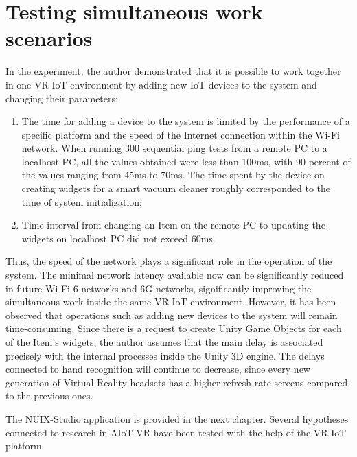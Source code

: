\section{Testing simultaneous work scenarios}

In the experiment, the author demonstrated that it is possible to work together in one VR-IoT environment by adding new IoT devices to the system and changing their parameters:
\begin{enumerate}
    \item The time for adding a device to the system is limited by the performance of a specific platform and the speed of the Internet connection within the Wi-Fi network. When running 300 sequential ping tests from a remote PC to a localhost PC, all the values ​​obtained were less than 100ms, with 90 percent of the values ranging from 45ms to 70ms. The time spent by the device on creating widgets for a smart vacuum cleaner roughly corresponded to the time of system initialization;
    \item Time interval from changing an Item on the remote PC to updating the widgets on localhost PC did not exceed 60ms.
\end{enumerate}

Thus, the speed of the network plays a significant role in the operation of the system. The minimal network latency available now can be significantly reduced in future Wi-Fi 6 networks and 6G networks, significantly improving the simultaneous work inside the same VR-IoT environment. However, it has been observed that operations such as adding new devices to the system will remain time-consuming. Since there is a request to create Unity Game Objects for each of the Item's widgets, the author assumes that the main delay is associated precisely with the internal processes inside the Unity 3D engine. The delays connected to hand recognition will continue to decrease, since every new generation of Virtual Reality headsets has a higher refresh rate screens compared to the previous ones. 

The NUIX-Studio application is provided in the next chapter. Several hypotheses connected to research in AIoT-VR have been tested with the help of the VR-IoT platform. 